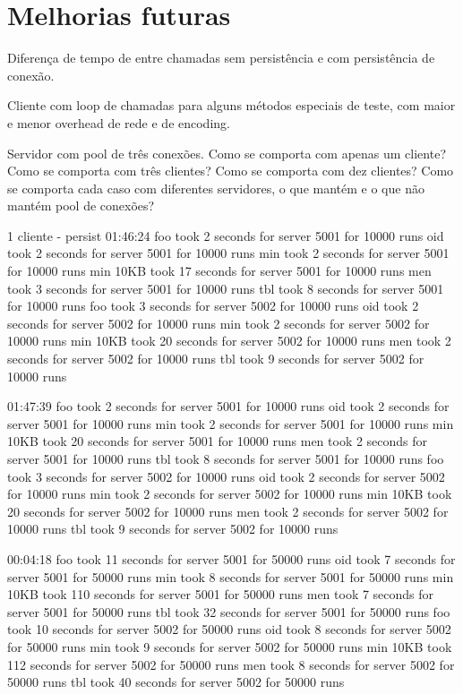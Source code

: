 \documentclass[11pt]{article}
\begin{document}
\section{Melhorias futuras}\label{sec:future}

Diferença de tempo de entre chamadas sem persistência e com persistência de
conexão.

Cliente com loop de chamadas para alguns métodos especiais de teste, com maior
e menor overhead de rede e de encoding.

Servidor com pool de três conexões.
Como se comporta com apenas um cliente?
Como se comporta com três clientes?
Como se comporta com dez clientes?
Como se comporta cada caso com diferentes servidores, o que mantém e o que não
mantém pool de conexões?


 1 cliente - persist
01:46:24
foo took 2 seconds for server 5001 for 10000 runs
oid took 2 seconds for server 5001 for 10000 runs
min took 2 seconds for server 5001 for 10000 runs
min 10KB took 17 seconds for server 5001 for 10000 runs
men took 3 seconds for server 5001 for 10000 runs
tbl took 8 seconds for server 5001 for 10000 runs
foo took 3 seconds for server 5002 for 10000 runs
oid took 2 seconds for server 5002 for 10000 runs
min took 2 seconds for server 5002 for 10000 runs
min 10KB took 20 seconds for server 5002 for 10000 runs
men took 2 seconds for server 5002 for 10000 runs
tbl took 9 seconds for server 5002 for 10000 runs

01:47:39
foo took 2 seconds for server 5001 for 10000 runs
oid took 2 seconds for server 5001 for 10000 runs
min took 2 seconds for server 5001 for 10000 runs
min 10KB took 20 seconds for server 5001 for 10000 runs
men took 2 seconds for server 5001 for 10000 runs
tbl took 8 seconds for server 5001 for 10000 runs
foo took 3 seconds for server 5002 for 10000 runs
oid took 2 seconds for server 5002 for 10000 runs
min took 2 seconds for server 5002 for 10000 runs
min 10KB took 20 seconds for server 5002 for 10000 runs
men took 2 seconds for server 5002 for 10000 runs
tbl took 9 seconds for server 5002 for 10000 runs


00:04:18
foo took 11 seconds for server 5001 for 50000 runs
oid took 7 seconds for server 5001 for 50000 runs
min took 8 seconds for server 5001 for 50000 runs
min 10KB took 110 seconds for server 5001 for 50000 runs
men took 7 seconds for server 5001 for 50000 runs
tbl took 32 seconds for server 5001 for 50000 runs
foo took 10 seconds for server 5002 for 50000 runs
oid took 8 seconds for server 5002 for 50000 runs
min took 9 seconds for server 5002 for 50000 runs
min 10KB took 112 seconds for server 5002 for 50000 runs
men took 8 seconds for server 5002 for 50000 runs
tbl took 40 seconds for server 5002 for 50000 runs
\end{document}
